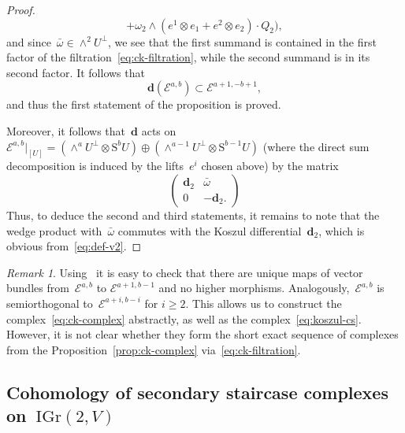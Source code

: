 \documentclass[a4paper]{article}
\newcommand{\IGr}{\mathrm{IGr}}
\newcommand{\cE}{\mathcal{E}}
\newcommand{\Sy}{\mathrm{S}}
\newcommand{\vn}{\mathbf{d}}
\theoremstyle{remark}
\newtheorem{remark}[theorem]{Remark}
\theoremstyle{definition}
\begin{document}
\begin{proof}
\begin{equation*}
+ \omega_2 \wedge (e^1 \otimes e_1 + e^2 \otimes e_2) \cdot Q_2\Big),
\end{equation*}
and since~\(\bar\omega \in \wedge^2U^\perp\), 
we see that the first summand is contained in the first factor of the filtration~\eqref{eq:ck-filtration},
while the second summand is in its second factor.
It follows that 
\begin{equation*}
\vn(\cE^{a,b}) \subset \cE^{a+1,-b+1},
\end{equation*}
and thus the first statement of the proposition is proved.

Moreover, it follows that~\(\vn\)
acts on~\(\cE^{a,b}\vert_{[U]} = (\wedge^a U^\perp \otimes \Sy^b U) \oplus (\wedge^{a-1} U^\perp \otimes \Sy^{b-1} U)\) 
(where the direct sum decomposition is induced by the lifts~\(e^i\) chosen above)
by the matrix
\begin{equation*}
\begin{pmatrix}
\vn_2 &
\bar\omega \\
0 &
-\vn_2.
\end{pmatrix}
\end{equation*}
Thus, to deduce the second and third statements, 
it remains to note that the wedge product with~\(\bar\omega\) commutes with the Koszul differential~\(\vn_2\),
which is obvious from~\eqref{eq:def-v2}.
\end{proof}

\begin{remark}
	\label{rem:E^bullet_unique}
	Using~\cite[Corollary~3.10]{F15} it is easy to check that there are unique maps of vector bundles from~\(\cE^{a,b}\) to \(\cE^{a+1,b-1}\) and no higher morphisms. Analogously,~\(\cE^{a,b}\) is semiorthogonal to~\(\cE^{a+i,b-i}\) for \(i \ge 2\). This allows us to construct the complex~\eqref{eq:ck-complex} abstractly, as well as the complex~\eqref{eq:koszul-cs}. However, it is not clear whether they form the short exact sequence of complexes from the Proposition~\ref{prop:ck-complex} via~\eqref{eq:ck-filtration}. 
\end{remark}


\subsection{Cohomology of secondary staircase complexes on~\texorpdfstring{\(\IGr(2,V)\)}{IGr(2,V)}}
\end{document}
